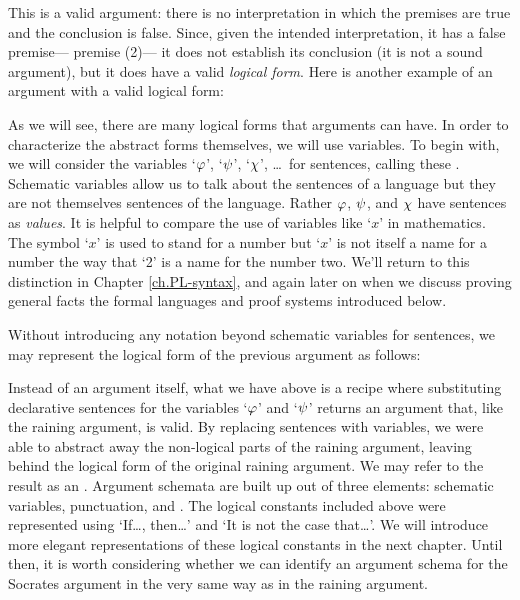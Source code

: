 This is a valid argument: there is no interpretation in which the premises are true and the conclusion is false.
Since, given the intended interpretation, it has a false premise--- premise (2)--- it does not establish its conclusion (it is not a sound argument), but it does have a valid \emph{logical form}.
Here is another example of an argument with a valid logical form:

\begin{earg}
\end{earg}

As we will see, there are many logical forms that arguments can have.
In order to characterize the abstract forms themselves, we will use variables.
To begin with, we will consider the variables `$\varphi$', `$\psi$', `$\chi$', \ldots\ for sentences, calling these .
Schematic variables allow us to talk about the sentences of a language but they are not themselves sentences of the language.
Rather $\varphi$, $\psi$, and $\chi$ have sentences as \textit{values}.
It is helpful to compare the use of variables like `$x$' in mathematics.
The symbol `$x$' is used to stand for a number but `$x$' is not itself a name for a number the way that `2' is a name for the number two.
We'll return to this distinction in Chapter \ref{ch.PL-syntax}, and again later on when we discuss proving general facts the formal languages and proof systems introduced below.

Without introducing any notation beyond schematic variables for sentences, we may represent the logical form of the previous argument as follows:

\begin{earg}
\end{earg}

Instead of an argument itself, what we have above is a recipe where substituting declarative sentences for the variables `$\varphi$' and `$\psi$' returns an argument that, like the raining argument, is valid.
By replacing sentences with variables, we were able to abstract away the non-logical parts of the raining argument, leaving behind the logical form of the original raining argument.
We may refer to the result as an .
Argument schemata are built up out of three elements: schematic variables, punctuation, and .
The logical constants included above were represented using `If\ldots, then\ldots' and `It is not the case that\ldots'.
We will introduce more elegant representations of these logical constants in the next chapter.
Until then, it is worth considering whether we can identify an argument schema for the Socrates argument in the very same way as in the raining argument.

